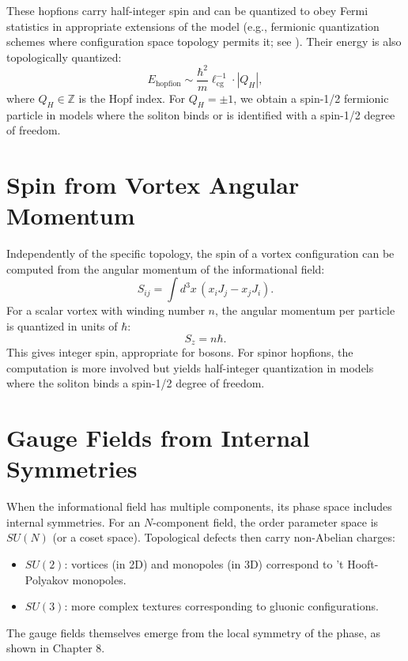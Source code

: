 \documentclass[12pt,a4paper]{book}
\begin{document}
These hopfions carry half-integer spin and can be quantized to obey Fermi statistics in appropriate extensions of the model (e.g., fermionic quantization schemes where configuration space topology permits it; see \cite{auckly2004}). Their energy is also topologically quantized:
\begin{equation}
    E_{\text{hopfion}} \sim \frac{\hbar^2}{m} \ell_{\text{cg}}^{-1} \cdot |Q_H|,
\end{equation}
where $Q_H \in \mathbb{Z}$ is the Hopf index. For $Q_H = \pm 1$, we obtain a spin-1/2 fermionic particle in models where the soliton binds or is identified with a spin-1/2 degree of freedom.

\section{Spin from Vortex Angular Momentum}

Independently of the specific topology, the spin of a vortex configuration can be computed from the angular momentum of the informational field:
\begin{equation}
    S_{ij} = \int d^3x \, (x_i J_j - x_j J_i).
\end{equation}
For a scalar vortex with winding number $n$, the angular momentum per particle is quantized in units of $\hbar$:
\begin{equation}
    S_z = n \hbar.
\end{equation}
This gives integer spin, appropriate for bosons. For spinor hopfions, the computation is more involved but yields half-integer quantization in models where the soliton binds a spin-1/2 degree of freedom.

\section{Gauge Fields from Internal Symmetries}

When the informational field has multiple components, its phase space includes internal symmetries. For an $N$-component field, the order parameter space is $SU(N)$ (or a coset space). Topological defects then carry non-Abelian charges:
\begin{itemize}
    \item $SU(2)$: vortices (in 2D) and monopoles (in 3D) correspond to 't Hooft-Polyakov monopoles.
    \item $SU(3)$: more complex textures corresponding to gluonic configurations.
\end{itemize}
The gauge fields themselves emerge from the local symmetry of the phase, as shown in Chapter 8.
\end{document}
